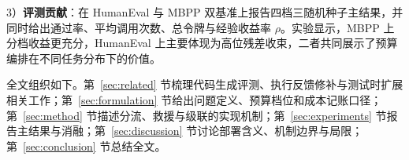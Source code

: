 3）\textbf{评测贡献}：在 HumanEval 与 MBPP 双基准上报告四档三随机种子主结果，并同时给出通过率、平均调用次数、总令牌与经验收益率 $\rho$。实验显示，MBPP 上分档收益更充分，HumanEval 上主要体现为高位残差收束，二者共同展示了预算编排在不同任务分布下的价值。

全文组织如下。第~\ref{sec:related} 节梳理代码生成评测、执行反馈修补与测试时扩展相关工作；第~\ref{sec:formulation} 节给出问题定义、预算档位和成本记账口径；第~\ref{sec:method} 节描述分流、救援与级联的实现机制；第~\ref{sec:experiments} 节报告主结果与消融；第~\ref{sec:discussion} 节讨论部署含义、机制边界与局限；第~\ref{sec:conclusion} 节总结全文。
